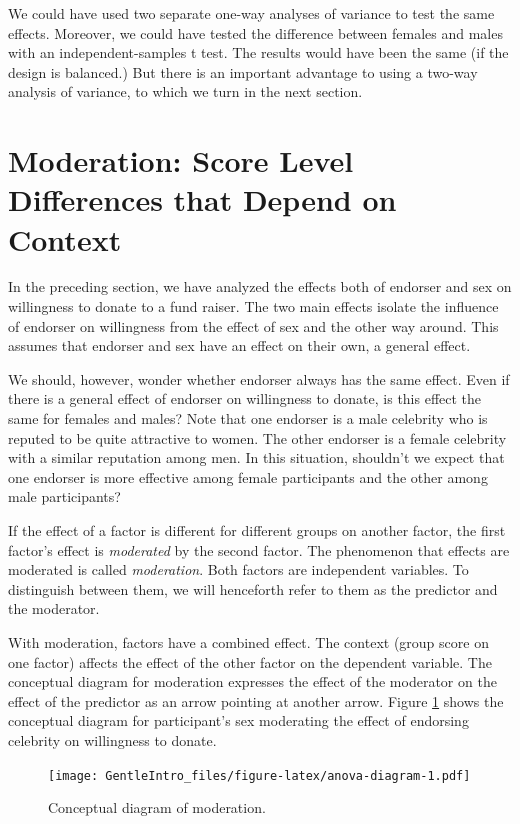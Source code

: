 \documentclass[a4paper]{book}
\theoremstyle{definition}
\theoremstyle{definition}
\theoremstyle{definition}
\theoremstyle{remark}
\begin{document}
We could have used two separate one-way analyses of variance to test the
same effects. Moreover, we could have tested the difference between
females and males with an independent-samples t test. The results would
have been the same (if the design is balanced.) But there is an
important advantage to using a two-way analysis of variance, to which we
turn in the next section.

\section{Moderation: Score Level Differences that Depend on
Context}\label{moderation-score-level-differences-that-depend-on-context}

In the preceding section, we have analyzed the effects both of endorser
and sex on willingness to donate to a fund raiser. The two main effects
isolate the influence of endorser on willingness from the effect of sex
and the other way around. This assumes that endorser and sex have an
effect on their own, a general effect.

We should, however, wonder whether endorser always has the same effect.
Even if there is a general effect of endorser on willingness to donate,
is this effect the same for females and males? Note that one endorser is
a male celebrity who is reputed to be quite attractive to women. The
other endorser is a female celebrity with a similar reputation among
men. In this situation, shouldn't we expect that one endorser is more
effective among female participants and the other among male
participants?

If the effect of a factor is different for different groups on another
factor, the first factor's effect is \emph{moderated} by the second
factor. The phenomenon that effects are moderated is called
\emph{moderation}. Both factors are independent variables. To
distinguish between them, we will henceforth refer to them as the
predictor and the moderator.

With moderation, factors have a combined effect. The context (group
score on one factor) affects the effect of the other factor on the
dependent variable. The conceptual diagram for moderation expresses the
effect of the moderator on the effect of the predictor as an arrow
pointing at another arrow. Figure \ref{fig:anova-diagram} shows the
conceptual diagram for participant's sex moderating the effect of
endorsing celebrity on willingness to donate.

\begin{figure}[H]
\centering
\texttt{[image: GentleIntro\_files/figure-latex/anova-diagram-1.pdf]}
\caption{\label{fig:anova-diagram}Conceptual diagram of moderation.}
\end{figure}
\end{document}
